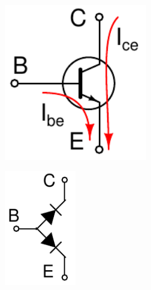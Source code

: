 \documentclass[beamer]{standalone}
\begin{document}
\begin{frame}
\begin{columns}[t]
\begin{column}{.75\textwidth}
 \end{column}
 \begin{column}{.25\textwidth}
  \begin{figure}
   \includegraphics[width=0.80\textwidth]{./schematics/npn_transistor_with_currents.pdf}
  \end{figure}
  \begin{figure}
   \includegraphics[width=0.40\textwidth]{./schematics/npn_diodes.pdf}
  \end{figure}

 \end{column}
\end{columns}
\end{frame}
 
\end{document}
